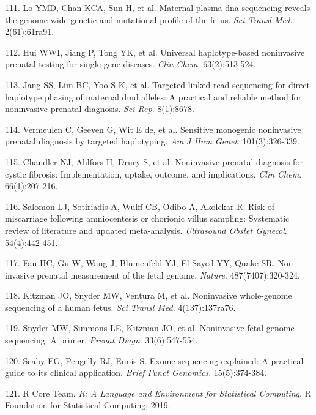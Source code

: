 \documentclass[11pt,letterpaper]{book}
\begin{document}
\leavevmode\hypertarget{ref-lo:2010aa}{}%
111. Lo YMD, Chan KCA, Sun H, et al. Maternal plasma dna sequencing reveals the genome-wide genetic and mutational profile of the fetus. \emph{Sci Transl Med}. 2(61):61ra91.

\leavevmode\hypertarget{ref-hui:2017aa}{}%
112. Hui WWI, Jiang P, Tong YK, et al. Universal haplotype-based noninvasive prenatal testing for single gene diseases. \emph{Clin Chem}. 63(2):513-524.

\leavevmode\hypertarget{ref-jang:2018aa}{}%
113. Jang SS, Lim BC, Yoo S-K, et al. Targeted linked-read sequencing for direct haplotype phasing of maternal dmd alleles: A practical and reliable method for noninvasive prenatal diagnosis. \emph{Sci Rep}. 8(1):8678.

\leavevmode\hypertarget{ref-vermeulen:2017aa}{}%
114. Vermeulen C, Geeven G, Wit E de, et al. Sensitive monogenic noninvasive prenatal diagnosis by targeted haplotyping. \emph{Am J Hum Genet}. 101(3):326-339.

\leavevmode\hypertarget{ref-chandler:2020aa}{}%
115. Chandler NJ, Ahlfors H, Drury S, et al. Noninvasive prenatal diagnosis for cystic fibrosis: Implementation, uptake, outcome, and implications. \emph{Clin Chem}. 66(1):207-216.

\leavevmode\hypertarget{ref-salomon:2019aa}{}%
116. Salomon LJ, Sotiriadis A, Wulff CB, Odibo A, Akolekar R. Risk of miscarriage following amniocentesis or chorionic villus sampling: Systematic review of literature and updated meta-analysis. \emph{Ultrasound Obstet Gynecol}. 54(4):442-451.

\leavevmode\hypertarget{ref-fan:2012aa}{}%
117. Fan HC, Gu W, Wang J, Blumenfeld YJ, El-Sayed YY, Quake SR. Non-invasive prenatal measurement of the fetal genome. \emph{Nature}. 487(7407):320-324.

\leavevmode\hypertarget{ref-kitzman:2012aa}{}%
118. Kitzman JO, Snyder MW, Ventura M, et al. Noninvasive whole-genome sequencing of a human fetus. \emph{Sci Transl Med}. 4(137):137ra76.

\leavevmode\hypertarget{ref-snyder:2013aa}{}%
119. Snyder MW, Simmons LE, Kitzman JO, et al. Noninvasive fetal genome sequencing: A primer. \emph{Prenat Diagn}. 33(6):547-554.

\leavevmode\hypertarget{ref-seaby:2016aa}{}%
120. Seaby EG, Pengelly RJ, Ennis S. Exome sequencing explained: A practical guide to its clinical application. \emph{Brief Funct Genomics}. 15(5):374-384.

\leavevmode\hypertarget{ref-r-core-team:2019aa}{}%
121. R Core Team. \emph{R: A Language and Environment for Statistical Computing}. R Foundation for Statistical Computing; 2019.
\end{document}
